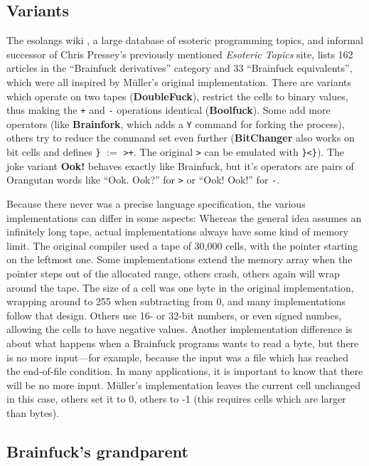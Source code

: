 \subsection{Variants}
\label{sec:brainfuck_variants}

The esolangs wiki \cite{esolang}, a large database of esoteric programming topics, and informal successor of Chris Pressey's previously mentioned \emph{Esoteric Topics} site, lists 162 articles in the “Brainfuck derivatives” category and 33 “Brainfuck equivalents”, which were all inspired by Müller's original implementation. There are variants which operate on two tapes (\textbf{DoubleFuck}), restrict the cells to binary values, thus making the \texttt{+} and \texttt{-} operations identical (\textbf{Boolfuck}). Some add more operators (like \textbf{Brainfork}, which adds a \texttt{Y} command for forking the process), others try to reduce the command set even further (\textbf{BitChanger} also works on bit cells and defines \texttt{\}} $:=$ \texttt{>+}. The original \texttt{>} can be emulated with \texttt{\}<\}}).
The joke variant \textbf{Ook!} behaves exactly like Brainfuck, but it's operators are pairs of Orangutan words like “Ook. Ook?” for \texttt{>} or “Ook! Ook!” for \texttt{-}.

Because there never was a precise language specification, the various implementations can differ in some aspects:
Whereas the general idea assumes an infinitely long tape, actual implementations always have some kind of memory limit. The original compiler used a tape of 30,000 cells, with the pointer starting on the leftmost one. Some implementations extend the memory array when the pointer steps out of the allocated range, others crash, others again will wrap around the tape.
The size of a cell was one byte in the original implementation, wrapping around to 255 when subtracting from 0, and many implementations follow that design. Others use 16- or 32-bit numbers, or even signed numbes, allowing the cells to have negative values.
Another implementation difference is about what happens when a Brainfuck programs wants to read a byte, but there is no more input---for example, because the input was a file which has reached the end-of-file condition. In many applications, it is important to know that there will be no more input. Müller's implementation leaves the current cell unchanged in this case, others set it to 0, others to -1 (this requires cells which are larger than bytes).

\subsection{Brainfuck's grandparent}

